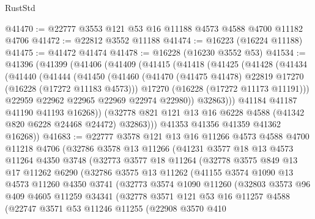 \begin{lexlean}{RustStd}
\begin{coremodule}
@41470 := @22777 @3553 @121 @53 @16 @11188 @4573 @4588 @4700 @11182 @4706
@41472 := @22812 @3552 @11188
@41474 := @16223 (@16224 @11188)
@41475 := @41472 @41474
@41478 := @16228 (@16230 @3552 @53)
@41534 := @41396
    (@41399
      (@41406
        (@41409
          (@41415
            (@41418
              (@41425
                (@41428
                  (@41434
                    (@41440
                      (@41444
                        (@41450
                          (@41460
                            (@41470 (@41475 @41478) @22819 @17270 (@16228 (@17272 @11183 @4573)))
                            @17270
                            (@16228 (@17272 @11173 @11191)))
                          @22959
                          @22962
                          @22965
                          @22969
                          @22974
                          @22980))
                      @32863)))
                @41184
                @41187
                @41190
                @41193
                @16268))
            (@32778 @821 @121 @13 @16 @6228 @4588 (@41342 @820 @6228 @24468 @24472) @32863)))
        @41353
        @41356
        @41359
        @41362
        @16268))
@41683 := @22777
    @3578
    @121
    @13
    @16
    @11266
    @4573
    @4588
    @4700
    @11218
    @4706
    (@32786
      @3578
      @13
      @11266
      (@41231
        @3577
        @18
        @13
        @4573
        @11264
        @4350
        @3748
        (@32773
          @3577
          @18
          @11264
          (@32778
            @3575
            @849
            @13
            @17
            @11262
            @6290
            (@32786
              @3575
              @13
              @11262
              (@41155
                @3574
                @1090
                @13
                @4573
                @11260
                @4350
                @3741
                (@32773
                  @3574
                  @1090
                  @11260
                  (@32803
                    @3573
                    @96
                    @409
                    @4605
                    @11259
                    @34341
                    (@32778
                      @3571
                      @121
                      @53
                      @16
                      @11257
                      @4588
                      (@22747
                        @3571
                        @53
                        @11246
                        @11255
                        (@22908
                          @3570
                          @410

\end{coremodule}
\end{lexlean}
